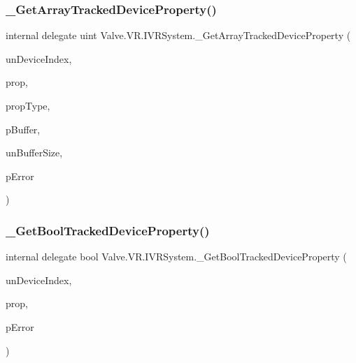 \subsubsection{\texorpdfstring{\_GetArrayTrackedDeviceProperty()}{\_GetArrayTrackedDeviceProperty()}}
{\footnotesize\ttfamily internal delegate uint Valve.\+V\+R.\+I\+V\+R\+System.\+\_\+\+Get\+Array\+Tracked\+Device\+Property (\begin{DoxyParamCaption}\item[{uint}]{un\+Device\+Index,  }\item[{\mbox{\hyperlink{namespace_valve_1_1_v_r_ab060521ead7273986988fc4897e52482}{E\+Tracked\+Device\+Property}}}]{prop,  }\item[{uint}]{prop\+Type,  }\item[{Int\+Ptr}]{p\+Buffer,  }\item[{uint}]{un\+Buffer\+Size,  }\item[{ref \mbox{\hyperlink{namespace_valve_1_1_v_r_aab6684f03930a2d2cf22ed66b437e47b}{E\+Tracked\+Property\+Error}}}]{p\+Error }\end{DoxyParamCaption})}

\mbox{\label{struct_valve_1_1_v_r_1_1_i_v_r_system_ad59f0298d859db814984c5b2c46e2a1c}} 
\subsubsection{\texorpdfstring{\_GetBoolTrackedDeviceProperty()}{\_GetBoolTrackedDeviceProperty()}}
{\footnotesize\ttfamily internal delegate bool Valve.\+V\+R.\+I\+V\+R\+System.\+\_\+\+Get\+Bool\+Tracked\+Device\+Property (\begin{DoxyParamCaption}\item[{uint}]{un\+Device\+Index,  }\item[{\mbox{\hyperlink{namespace_valve_1_1_v_r_ab060521ead7273986988fc4897e52482}{E\+Tracked\+Device\+Property}}}]{prop,  }\item[{ref \mbox{\hyperlink{namespace_valve_1_1_v_r_aab6684f03930a2d2cf22ed66b437e47b}{E\+Tracked\+Property\+Error}}}]{p\+Error }\end{DoxyParamCaption})}

\mbox{\label{struct_valve_1_1_v_r_1_1_i_v_r_system_a0a9463bae6cfe3289f8b18e79db1dbb4}} 
